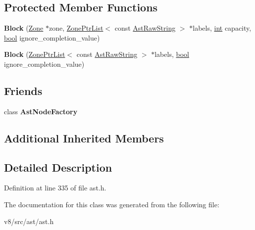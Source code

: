 \subsection*{Protected Member Functions}
\begin{DoxyCompactItemize}
\item 
\mbox{\label{classv8_1_1internal_1_1Block_a02a8b5f0e5921e14f86412ed45d6e05c}} 
{\bfseries Block} (\mbox{\hyperlink{classv8_1_1internal_1_1Zone}{Zone}} $\ast$zone, \mbox{\hyperlink{classv8_1_1internal_1_1ZoneList}{Zone\+Ptr\+List}}$<$ const \mbox{\hyperlink{classv8_1_1internal_1_1AstRawString}{Ast\+Raw\+String}} $>$ $\ast$labels, \mbox{\hyperlink{classint}{int}} capacity, \mbox{\hyperlink{classbool}{bool}} ignore\+\_\+completion\+\_\+value)
\item 
\mbox{\label{classv8_1_1internal_1_1Block_a4fdc4317e444b3e9194f2883a464dc23}} 
{\bfseries Block} (\mbox{\hyperlink{classv8_1_1internal_1_1ZoneList}{Zone\+Ptr\+List}}$<$ const \mbox{\hyperlink{classv8_1_1internal_1_1AstRawString}{Ast\+Raw\+String}} $>$ $\ast$labels, \mbox{\hyperlink{classbool}{bool}} ignore\+\_\+completion\+\_\+value)
\end{DoxyCompactItemize}
\subsection*{Friends}
\begin{DoxyCompactItemize}
\item 
\mbox{\label{classv8_1_1internal_1_1Block_a8d587c8ad3515ff6433eb83c578e795f}} 
class {\bfseries Ast\+Node\+Factory}
\end{DoxyCompactItemize}
\subsection*{Additional Inherited Members}


\subsection{Detailed Description}


Definition at line 335 of file ast.\+h.



The documentation for this class was generated from the following file\+:\begin{DoxyCompactItemize}
\item 
v8/src/ast/ast.\+h\end{DoxyCompactItemize}
